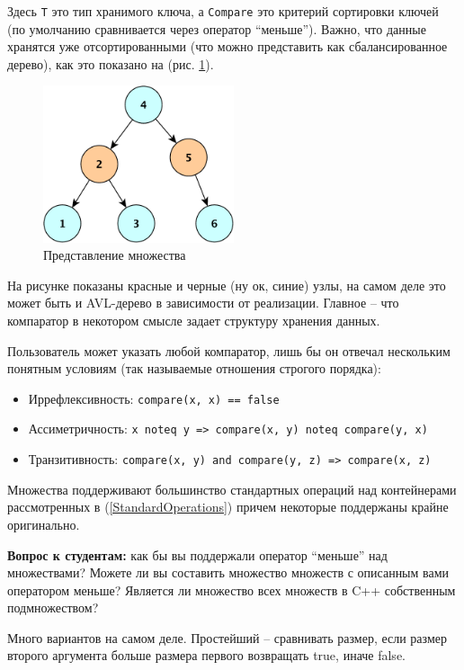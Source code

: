 \documentclass[a4paper,12pt,oneside]{article}
\newif\ifanswers
\begin{document}
Здесь \lstinline!T! это тип хранимого ключа, а \lstinline!Compare! это критерий сортировки ключей (по умолчанию сравнивается через оператор ``меньше''). Важно, что данные хранятся уже отсортированными (что можно представить как сбалансированное дерево), как это показано на (рис. \ref{fig:sets}).

\begin{figure}[ht]
\centering
\includegraphics[width=0.5\textwidth]{illustrations/sets-crop.pdf}
\caption{Представление множества}
\label{fig:sets}
\end{figure}

На рисунке показаны красные и черные (ну ок, синие) узлы, на самом деле это может быть и AVL-дерево в зависимости от реализации. Главное -- что компаратор в некотором смысле задает структуру хранения данных.

Пользователь может указать любой компаратор, лишь бы он отвечал нескольким понятным условиям (так называемые отношения строгого порядка):

\begin {itemize}
\item Иррефлексивность: \lstinline!compare(x, x) == false!
\item Ассиметричность: \lstinline!x noteq y => compare(x, y) noteq compare(y, x)!
\item Транзитивность: \lstinline!compare(x, y) and compare(y, z) => compare(x, z)!
\end {itemize}

Множества поддерживают большинство стандартных операций над контейнерами рассмотренных в (\ref{StandardOperations}) причем некоторые поддержаны крайне оригинально.

\textbf{Вопрос к студентам:} как бы вы поддержали оператор ``меньше'' над множествами? Можете ли вы составить множество множеств с описанным вами оператором меньше? Является ли множество всех множеств в C++ собственным подмножеством?

\ifanswers
Много вариантов на самом деле. Простейший -- сравнивать размер, если размер второго аргумента больше размера первого возвращать true, иначе false.
\end{document}

